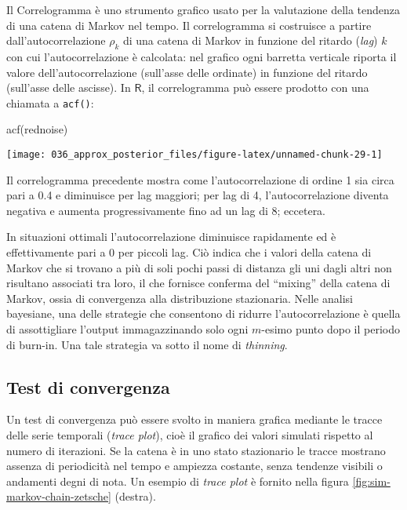 \documentclass[
]{memoir}
\newenvironment{Shaded}{\begin{snugshade}}{\end{snugshade}}
\newcommand{\FunctionTok}[1]{\textcolor[rgb]{0.00,0.00,0.00}{#1}}
\newcommand{\NormalTok}[1]{#1}
\newcommand{\R}{\textsf{R}} %
\begin{document}
Il Correlogramma è uno strumento grafico usato per la valutazione della tendenza di una catena di Markov nel tempo. Il correlogramma si costruisce a partire dall'autocorrelazione \(\rho_k\) di una catena di Markov in funzione del ritardo (\emph{lag}) \(k\) con cui l'autocorrelazione è calcolata: nel grafico ogni barretta verticale riporta il valore dell'autocorrelazione (sull'asse delle ordinate) in funzione del ritardo (sull'asse delle ascisse). In \(\R\), il correlogramma può essere prodotto con una chiamata a \texttt{acf()}:

\begin{Shaded}
\begin{Highlighting}[]
\FunctionTok{acf}\NormalTok{(rednoise)}
\end{Highlighting}
\end{Shaded}

\begin{center}\texttt{[image: 036\_approx\_posterior\_files/figure-latex/unnamed-chunk-29-1]} \end{center}

Il correlogramma precedente mostra come l'autocorrelazione di ordine 1 sia circa pari a 0.4 e diminuisce per lag maggiori; per lag di 4, l'autocorrelazione diventa negativa e aumenta progressivamente fino ad un lag di 8; eccetera.

In situazioni ottimali l'autocorrelazione diminuisce rapidamente ed è effettivamente pari a 0 per piccoli lag. Ciò indica che i valori della catena di Markov che si trovano a più di soli pochi passi di distanza gli uni dagli altri non risultano associati tra loro, il che fornisce conferma del ``mixing'' della catena di Markov, ossia di convergenza alla distribuzione stazionaria.
Nelle analisi bayesiane, una delle strategie che consentono di ridurre l'autocorrelazione è quella di assottigliare l'output immagazzinando solo ogni \(m\)-esimo punto dopo il periodo di burn-in. Una tale strategia va sotto il nome di \emph{thinning}.

\hypertarget{test-di-convergenza}{%
\subsection{Test di convergenza}\label{test-di-convergenza}}

Un test di convergenza può essere svolto in maniera grafica mediante le tracce delle serie temporali (\emph{trace plot}), cioè il grafico dei valori simulati rispetto al numero di iterazioni. Se la catena è in uno stato stazionario le tracce mostrano assenza di periodicità nel tempo e ampiezza costante, senza tendenze visibili o andamenti degni di nota. Un esempio di \emph{trace plot} è fornito nella figura \ref{fig:sim-markov-chain-zetsche} (destra).
\end{document}
